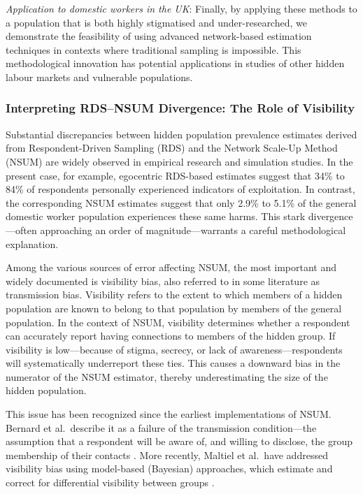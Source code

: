 \documentclass[
  12pt,
  letterpaper,
  DIV=11,
  numbers=noendperiod]{scrartcl}
\theoremstyle{plain}
\theoremstyle{definition}
\begin{document}
\emph{Application to domestic workers in the UK}: Finally, by applying
these methods to a population that is both highly stigmatised and
under-researched, we demonstrate the feasibility of using advanced
network-based estimation techniques in contexts where traditional
sampling is impossible. This methodological innovation has potential
applications in studies of other hidden labour markets and vulnerable
populations.

\subsubsection{Interpreting RDS--NSUM Divergence: The Role of
Visibility}\label{interpreting-rdsnsum-divergence-the-role-of-visibility}

Substantial discrepancies between hidden population prevalence estimates
derived from Respondent-Driven Sampling (RDS) and the Network Scale-Up
Method (NSUM) are widely observed in empirical research and simulation
studies. In the present case, for example, egocentric RDS-based
estimates suggest that 34\% to 84\% of respondents personally
experienced indicators of exploitation. In contrast, the corresponding
NSUM estimates suggest that only 2.9\% to 5.1\% of the general domestic
worker population experiences these same harms. This stark
divergence---often approaching an order of magnitude---warrants a
careful methodological explanation.

Among the various sources of error affecting NSUM, the most important
and widely documented is visibility bias, also referred to in some
literature as transmission bias. Visibility refers to the extent to
which members of a hidden population are known to belong to that
population by members of the general population. In the context of NSUM,
visibility determines whether a respondent can accurately report having
connections to members of the hidden group. If visibility is
low---because of stigma, secrecy, or lack of awareness---respondents
will systematically underreport these ties. This causes a downward bias
in the numerator of the NSUM estimator, thereby underestimating the size
of the hidden population.

This issue has been recognized since the earliest implementations of
NSUM. Bernard et al.~describe it as a failure of the transmission
condition---the assumption that a respondent will be aware of, and
willing to disclose, the group membership of their contacts
\autocite{bern10-counting}. More recently, Maltiel et al.~have addressed
visibility bias using model-based (Bayesian) approaches, which estimate
and correct for differential visibility between groups
\autocite{malt15-estimating}.
\end{document}

